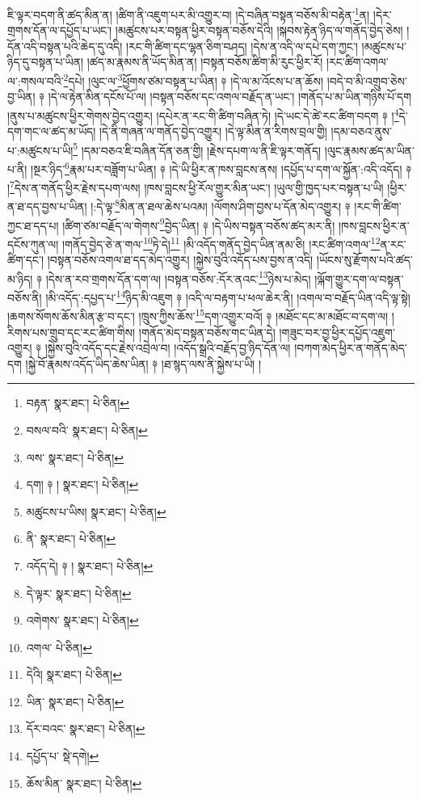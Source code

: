 ཇི་ལྟར་བདག་ནི་ཚད་མིན་ན། །ཚིག་ནི་འཇུག་པར་མི་འགྱུར་བ། །དེ་བཞིན་བསྟན་བཅོས་མི་བརྟེན་\footnote{བརྟན་  སྣར་ཐང་།  པེ་ཅིན། }ན། །དེར་གྲགས་དོན་ལ་དཔྱོད་པ་ཡང་། །མཚུངས་པར་བསྟན་ཕྱིར་བསྟན་བཅོས་དེའི། །སྐབས་རྟེན་ཉིད་ལ་གནོད་བྱེད་ཅེས། །དོན་འདི་བསྟན་པའི་ཆེད་དུ་འདི། །རང་གི་ཚིག་དང་ལྷན་ཅིག་བཤད། །དེས་ན་འདི་ལ་དཔེ་དག་ཀྱང་། །མཚུངས་པ་ཉིད་དུ་བསྟན་པ་ཡིན། །ཚད་མ་རྣམས་ནི་ཡོད་མིན་ན། །བསྟན་བཅོས་ཚིག་མི་རུང་ཕྱིར་རོ། །རང་ཚིག་འགལ་ལ་:གསལ་བའི་\footnote{བསལ་བའི་  སྣར་ཐང་།  པེ་ཅིན། }དཔེ། །ལུང་ལ་\footnote{ལས་  སྣར་ཐང་།  པེ་ཅིན། }ཕྱོགས་ཙམ་བསྟན་པ་ཡིན། ༈ །དེ་ལ་མ་འོངས་པ་ན་ཆོས། །བདེ་བ་མི་འགྲུབ་ཅེས་བྱ་ཡིན། ༈ །དེ་ལ་རྟེན་མིན་དངོས་པོ་ལ། །བསྟན་བཅོས་དང་འགལ་བརྗོད་ན་ཡང་། །གནོད་པ་མ་ཡིན་གཉིས་པོ་དག །ནུས་པ་མཚུངས་ཕྱིར་གེགས་བྱེད་འགྱུར། །དཔེར་ན་རང་གི་ཚིག་བཞིན་ཏེ། །དེ་ཡང་དེ་ཚེ་རང་ཚིག་བདག ༈ །\footnote{དག། ༈ །  སྣར་ཐང་།  པེ་ཅིན། }དེ་དག་གང་ལ་ཚད་མ་ཡོད། །དེ་ནི་གཞན་ལ་གནོད་བྱེད་འགྱུར། །དེ་ལྟ་མིན་ན་རིགས་བྲལ་གྱི། །དམ་བཅའ་ནུས་པ་:མཚུངས་པ་ཡི།\footnote{མཚུངས་པ་ཡིས།  སྣར་ཐང་།  པེ་ཅིན། } །དམ་བཅའ་ཇི་བཞིན་དོན་ཅན་གྱི། །རྗེས་དཔག་ལ་ནི་ཇི་ལྟར་གནོད། །ལུང་རྣམས་ཚད་མ་ཡིན་པ་ནི། །སྔར་ཉིད་\footnote{ནི་  སྣར་ཐང་།  པེ་ཅིན། }རྣམ་པར་བཟློག་པ་ཡིན། ༈ །དེ་ཡི་ཕྱིར་ན་ཁས་བླངས་ནས། །དཔྱོད་པ་དག་ལ་སྐྱོན་:འདི་འདོད། ༈ །\footnote{འདོད་དེ། ༈ །  སྣར་ཐང་།  པེ་ཅིན། }དེས་ན་གནོད་ཕྱིར་རྗེས་དཔག་ལས། །ཁས་བླངས་ཕྱི་རོལ་གྱུར་མིན་ཡང་། །ཡུལ་གྱི་ཁྱད་པར་བསྟན་པ་ཡི། །ཕྱིར་ན་ཐ་དད་བྱས་པ་ཡིན། །:དེ་ལྟ་\footnote{དེ་ལྟར་  སྣར་ཐང་།  པེ་ཅིན། }མིན་ན་ཐལ་ཆེས་པའམ། །ལོགས་ཤིག་བྱས་པ་དོན་མེད་འགྱུར། ༈ །རང་གི་ཚིག་ཀྱང་ཐ་དད་པ། །ཚིག་ཙམ་བརྗོད་ལ་གེགས་\footnote{འགེགས་  སྣར་ཐང་།  པེ་ཅིན། }བྱེད་ཡིན། ༈ །དེ་ཡིས་བསྟན་བཅོས་ཚད་མར་ནི། །ཁས་བླངས་ཕྱིར་ན་དངོས་ཀུན་ལ། །གནོད་བྱེད་ཅེ་ན་གལ་\footnote{འགལ་  པེ་ཅིན། }ཏེ་དེ།\footnote{དེའི།  སྣར་ཐང་།  པེ་ཅིན། } །མི་འདོད་གནོད་བྱེད་ཡིན་ནམ་ཅི། །རང་ཚིག་འགལ་\footnote{ཡིན་  སྣར་ཐང་།  པེ་ཅིན། }ན་རང་ཚིག་དང་། །བསྟན་བཅོས་འགལ་ཐ་དད་མེད་འགྱུར། །སྐྱེས་བུའི་འདོད་པས་བྱས་ན་འདི། །ཡོངས་སུ་རྫོགས་པའི་ཚད་མ་ཉིད། ༈ །དེས་ན་རབ་གྲགས་དོན་དག་ལ། །བསྟན་བཅོས་:དོར་ནའང་\footnote{དོར་བའང་  སྣར་ཐང་།  པེ་ཅིན། }ཉེས་པ་མེད། །ལྐོག་གྱུར་དག་ལ་བསྟན་བཅོས་ནི། །མི་འདོད་:དཔྱད་པ་\footnote{དཔྱོད་པ་  སྡེ་དགེ། }ཉིད་མི་འཇུག ༈ །འདི་ལ་བརྟག་པ་ཕལ་ཆེར་ནི། །འགལ་བ་བརྗོད་ཡིན་འདི་ལྟ་སྟེ། །ཆགས་སོགས་ཆོས་མིན་རྩ་བ་དང་། །ཁྲུས་ཀྱིས་ཆོས་\footnote{ཆོས་མིན་  སྣར་ཐང་།  པེ་ཅིན། }དག་འགྱུར་བའོ། ༈ །མཐོང་དང་མ་མཐོང་བ་དག་ལ། །རིགས་པས་གྲུབ་དང་རང་ཚིག་གིས། །གནོད་མེད་བསྟན་བཅོས་གང་ཡིན་དེ། །གཟུང་བར་བྱ་ཕྱིར་དཔྱོད་འཇུག་འགྱུར། ༈ །སྐྱེས་བུའི་འདོད་དང་རྗེས་འབྲེལ་བ། །འདོད་སྒྲའི་བརྗོད་བྱ་ཉིད་དོན་ལ། །བཀག་མེད་ཕྱིར་ན་གནོད་མེད་དག །སྐྱེ་བོ་རྣམས་འདོད་ཡིད་ཆེས་ཡིན། ༈ །ཐ་སྙད་ལས་ནི་སྐྱེས་པ་ཡི། །
